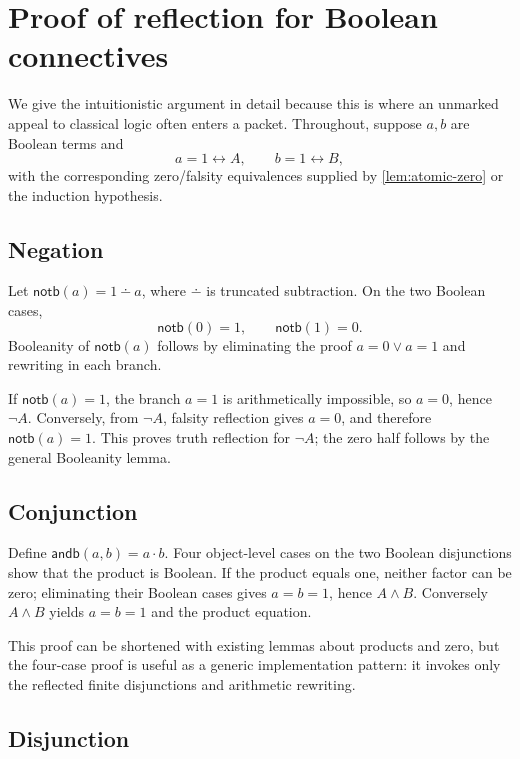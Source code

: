 \section{Proof of reflection for Boolean connectives}
\label{sec:connectives}

We give the intuitionistic argument in detail because this is where an
unmarked appeal to classical logic often enters a packet.  Throughout, suppose
\(a,b\) are Boolean terms and
\[
  a=1\leftrightarrow A,
  \qquad
  b=1\leftrightarrow B,
\]
with the corresponding zero/falsity equivalences supplied by
\cref{lem:atomic-zero} or the induction hypothesis.

\subsection{Negation}

Let \(\mathsf{notb}(a)=1\dotminus a\), where \(\dotminus\) is truncated
subtraction.  On the two Boolean cases,
\[
  \mathsf{notb}(0)=1,
  \qquad
  \mathsf{notb}(1)=0.
\]
Booleanity of \(\mathsf{notb}(a)\) follows by eliminating the proof
\(a=0\vee a=1\) and rewriting in each branch.

If \(\mathsf{notb}(a)=1\), the branch \(a=1\) is arithmetically impossible, so
\(a=0\), hence \(\neg A\).  Conversely, from \(\neg A\), falsity reflection
gives \(a=0\), and therefore \(\mathsf{notb}(a)=1\).  This proves truth
reflection for \(\neg A\); the zero half follows by the general Booleanity
lemma.

\subsection{Conjunction}

Define \(\mathsf{andb}(a,b)=a\cdot b\).  Four object-level cases on the two
Boolean disjunctions show that the product is Boolean.  If the product equals
one, neither factor can be zero; eliminating their Boolean cases gives
\(a=b=1\), hence \(A\wedge B\).  Conversely \(A\wedge B\) yields
\(a=b=1\) and the product equation.

This proof can be shortened with existing lemmas about products and zero, but
the four-case proof is useful as a generic implementation pattern: it invokes
only the reflected finite disjunctions and arithmetic rewriting.

\subsection{Disjunction}

